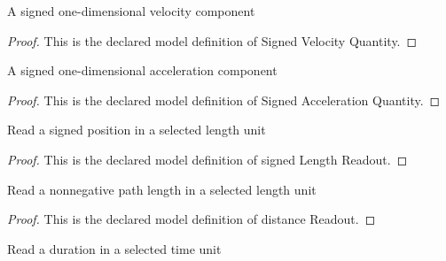 \begin{definition}
  \label{def:physics:phyx-mini-0670:phyxminiproblems-problemphyxmini0670-signedvelocityquantity}
  A signed one-dimensional velocity component
\end{definition}
\begin{proof}
  This is the declared model definition of Signed Velocity Quantity.
\end{proof}
\begin{definition}
  \label{def:physics:phyx-mini-0670:phyxminiproblems-problemphyxmini0670-signedaccelerationquantity}
  A signed one-dimensional acceleration component
\end{definition}
\begin{proof}
  This is the declared model definition of Signed Acceleration Quantity.
\end{proof}
\begin{definition}
  \label{def:physics:phyx-mini-0670:phyxminiproblems-problemphyxmini0670-signedlengthreadout}
  Read a signed position in a selected length unit
\end{definition}
\begin{proof}
  This is the declared model definition of signed Length Readout.
\end{proof}
\begin{definition}
  \label{def:physics:phyx-mini-0670:phyxminiproblems-problemphyxmini0670-distancereadout}
  Read a nonnegative path length in a selected length unit
\end{definition}
\begin{proof}
  This is the declared model definition of distance Readout.
\end{proof}
\begin{definition}
  \label{def:physics:phyx-mini-0670:phyxminiproblems-problemphyxmini0670-timereadout}
  Read a duration in a selected time unit
\end{definition}
